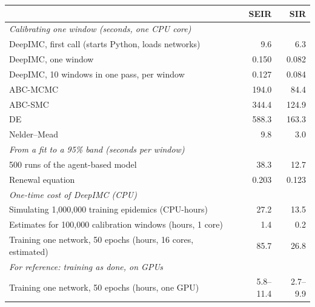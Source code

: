 \begin{tabular}{lrr}
\toprule
 & SEIR & SIR \\
\midrule
\multicolumn{3}{l}{\textit{Calibrating one window (seconds, one CPU core)}} \\
DeepIMC, first call (starts Python, loads networks) & 9.6 & 6.3 \\
DeepIMC, one window & 0.150 & 0.082 \\
DeepIMC, 10 windows in one pass, per window & 0.127 & 0.084 \\
ABC-MCMC & 194.0 & 84.4 \\
ABC-SMC & 344.4 & 124.9 \\
DE & 588.3 & 163.3 \\
Nelder--Mead & 9.8 & 3.0 \\
\midrule
\multicolumn{3}{l}{\textit{From a fit to a 95\% band (seconds per window)}} \\
500 runs of the agent-based model & 38.3 & 12.7 \\
Renewal equation & 0.203 & 0.123 \\
\midrule
\multicolumn{3}{l}{\textit{One-time cost of DeepIMC (CPU)}} \\
Simulating 1,000,000 training epidemics (CPU-hours) & 27.2 & 13.5 \\
Estimates for 100,000 calibration windows (hours, 1 core) & 1.4 & 0.2 \\
Training one network, 50 epochs (hours, 16 cores, estimated) & 85.7 & 26.8 \\
\midrule
\multicolumn{3}{l}{\textit{For reference: training as done, on GPUs}} \\
Training one network, 50 epochs (hours, one GPU) & 5.8--11.4 & 2.7--9.9 \\
\bottomrule
\end{tabular}
